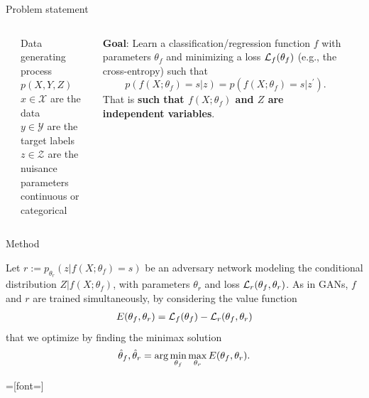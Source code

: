 \documentclass[final,unknownkeysallowed]{beamer}
\begin{document}
\begin{frame}{}
\begin{textblock}{0.32}
\begin{block}{Problem statement \phantom{p}}
\begin{columns}[t]
\begin{column}{0.02\textwidth}
\end{column}
\begin{column}{0.48\textwidth}
Data generating process $p(X, Y, Z)$ \\
$x \in \mathcal{X}$ are the data \\
$y \in \mathcal{Y}$ are the target labels \\
$z \in \mathcal{Z}$ are the nuisance parameters \\
\hspace{1.2cm} continuous or categorical
\end{column}
\begin{column}{0.48\textwidth}
\textbf{\color{red} Goal}: Learn a classification/regression function $f$
with parameters $\theta_{f}$ and minimizing a loss ${\cal L}_f(\theta_f)$ (e.g., the cross-entropy) such that
$$p(f(X ; \theta_f) = s | z ) = p(f(X ; \theta_f) = s | z^\prime ).$$
That is {\color{blue}\bf such that $f(X ; \theta_f)$ and $Z$ are independent variables}.
\end{column}
\begin{column}{0.02\textwidth}
\end{column}
\end{columns}

\end{block}

\vspace{0.5cm}
\begin{block}{Method \phantom{p}}

Let $r := p_{\theta_r}(z | f(X;\theta_f)=s)$ be {\color{red} an adversary network} modeling the conditional distribution $Z|f(X;\theta_f)$, with
parameters $\theta_r$ and loss ${\cal L}_r(\theta_f, \theta_r)$. As in GANs, $f$ and $r$ are trained simultaneously, by considering the value function
\begin{align}
E(\theta_f, \theta_r) = {\cal L}_f(\theta_f) - {\cal L}_r(\theta_f, \theta_r)
\end{align}
that we optimize by finding the minimax solution
\begin{align}
\smash{\hat\theta_f, \hat\theta_r} = \arg \min_{\theta_f} \max_{\theta_r} E(\theta_f, \theta_r).
\end{align}

\begin{center}
=[font=\fontsize{25}{11.2}]
\begin{figure}


\end{figure}
\end{center}
\end{block}
\end{textblock}
\end{frame}
\end{document}
